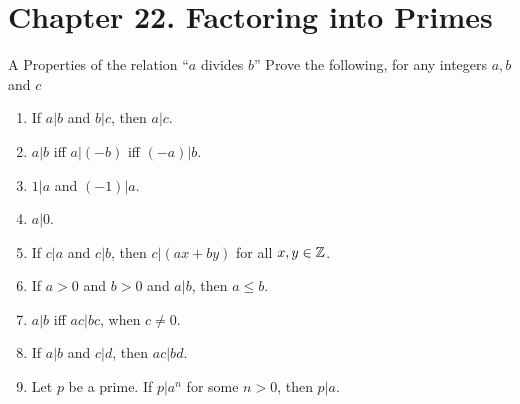 \section*{Chapter 22. Factoring into Primes}


\begin{exercise}{A Properties of the relation ``$a$ divides $b$''}
Prove the following, for any integers $a,b$ and $c$
\begin{enumerate}
    \item If $a\vert b$ and $b\vert c$, then $a\vert c$.
    \item $a\vert b$ iff $a\vert (-b)$ iff $(-a)\vert b$.
    \item $1\vert a$ and $(-1)\vert a$.
    \item $a\vert 0$.
    \item If $c\vert a$ and $c\vert b$, then $c\vert (ax+by)$ for all $x,y\in \mathbb{Z}$.
    \item If $a>0$ and $b>0$ and $a\vert b$, then $a\leq b$.
    \item $a\vert b$ iff $ac\vert bc$, when $c\neq 0$.
    \item If $a\vert b$ and $c\vert d$, then $ac\vert bd$.
    \item Let $p$ be a prime. If $p\vert a^{n}$ for some $n>0$, then $p\vert a$.
\end{enumerate}
\end{exercise}
